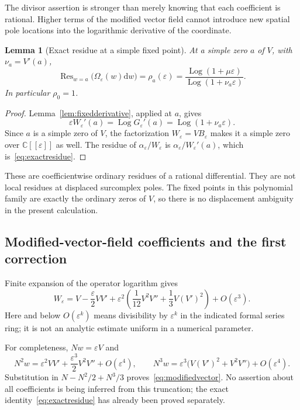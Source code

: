 \documentclass[11pt,a4paper]{article}
\numberwithin{equation}{section}
\newtheorem{lemma}[theorem]{Lemma}
\theoremstyle{definition}
\theoremstyle{remark}
\newcommand{\C}{\mathbb C}
\newcommand{\eps}{\varepsilon}
\newcommand{\dd}{\mathrm d}
\newcommand{\Res}{\operatorname{Res}}
\newcommand{\Log}{\operatorname{Log}}
\begin{document}
The divisor assertion is stronger than merely knowing that each coefficient
is rational.  Higher terms of the modified vector field cannot introduce
new spatial pole locations into the logarithmic derivative of the
coordinate.

\begin{lemma}[Exact residue at a simple fixed point]
\label{lem:residue}
At a simple zero $a$ of $V$, with $\nu_a=V'(a)$,
\begin{equation}\label{eq:exactresidue}
 \Res_{w=a}\bigl(\Omega_\eps(w)\dd w\bigr)
 =\rho_a(\eps)
 =\frac{\Log(1+\mu\eps)}{\Log(1+\nu_a\eps)}.
\end{equation}
In particular $\rho_0=1$.
\end{lemma}

\begin{proof}
Lemma~\ref{lem:fixedderivative}, applied at $a$, gives
\[
 \eps W_\eps'(a)=\Log G_\eps'(a)=\Log(1+\nu_a\eps).
\]
Since $a$ is a simple zero of $V$, the factorization
$W_\eps=V B_\eps$ makes it a simple zero over $\C[[\eps]]$ as well.
The residue of $\alpha_\eps/W_\eps$ is
$\alpha_\eps/W_\eps'(a)$, which is~\eqref{eq:exactresidue}.
\end{proof}

These are coefficientwise ordinary residues of a rational differential.
They are not local residues at displaced surcomplex poles.  The fixed
points in this polynomial family are exactly the ordinary zeros of $V$,
so there is no displacement ambiguity in the present calculation.

\subsection{Modified-vector-field coefficients and the first correction}

Finite expansion of the operator logarithm gives
\begin{equation}\label{eq:modifiedvector}
 W_\eps
 =V-\frac\eps2 VV'
 +\eps^2\left(\frac1{12}V^2V''+\frac13 V(V')^2\right)
 +O(\eps^3).
\end{equation}
Here and below $O(\eps^k)$ means divisibility by $\eps^k$ in the indicated
formal series ring; it is not an analytic estimate uniform in a numerical
parameter.

For completeness, $Nw=\eps V$ and
\[
 N^2w=\eps^2 VV'+\frac{\eps^3}{2}V^2V''+O(\eps^4),
 \qquad
 N^3w=\eps^3\bigl(V(V')^2+V^2V''\bigr)+O(\eps^4).
\]
Substitution in $N-N^2/2+N^3/3$ proves~\eqref{eq:modifiedvector}.
No assertion about all coefficients is being inferred from this truncation;
the exact identity~\eqref{eq:exactresidue} has already been proved separately.
\end{document}
